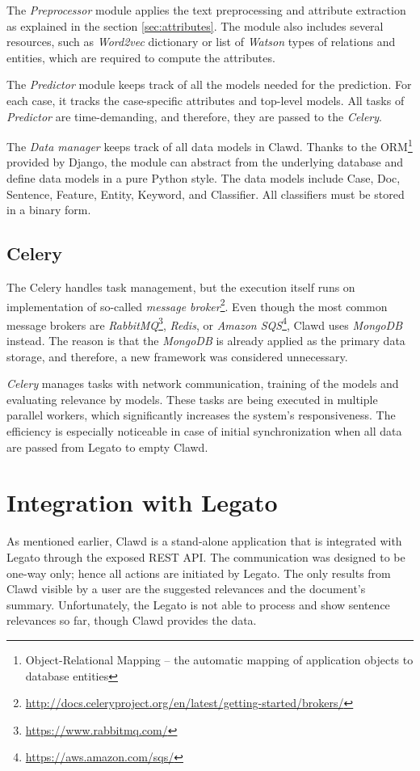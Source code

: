 \documentclass[
  digital, %
  notable,   %
  nolof,     %
  nolot,     %
]{fithesis3}
\begin{document}
The \textit{Preprocessor} module applies the text preprocessing and attribute extraction as explained in the section \ref{sec:attributes}.
The module also includes several resources, such as \textit{Word2vec} dictionary or list of \textit{Watson} types of relations and entities, which are required to compute the attributes.

The \textit{Predictor} module keeps track of all the models needed for the prediction.
For each case, it tracks the case-specific attributes and top-level models.
All tasks of \textit{Predictor} are time-demanding, and therefore, they are passed to the \textit{Celery}.

The \textit{Data manager} keeps track of all data models in Clawd.
Thanks to the ORM\footnote{Object-Relational Mapping -- the automatic mapping of application objects to database entities} provided by Django, the module can abstract from the underlying database and define data models in a pure Python style.
The data models include Case, Doc, Sentence, Feature, Entity, Keyword, and Classifier.
All classifiers must be stored in a binary form.

\subsection{Celery}
The Celery handles task management, but the execution itself runs on implementation of so-called \textit{message broker}\footnote{\url{http://docs.celeryproject.org/en/latest/getting-started/brokers/}}.
Even though the most common message brokers are \textit{RabbitMQ}\footnote{\url{https://www.rabbitmq.com/}}, \textit{Redis}, or \textit{Amazon SQS}\footnote{\url{https://aws.amazon.com/sqs/}}, Clawd uses \textit{MongoDB} instead.
The reason is that the \textit{MongoDB} is already applied as the primary data storage, and therefore, a new framework was considered unnecessary.

\textit{Celery} manages tasks with network communication, training of the models and evaluating relevance by models.
These tasks are being executed in multiple parallel workers, which significantly increases the system's responsiveness.
The efficiency is especially noticeable in case of initial synchronization when all data are passed from Legato to empty Clawd.


\section{Integration with Legato}
As mentioned earlier, Clawd is a stand-alone application that is integrated with Legato through the exposed REST API.
The communication was designed to be one-way only; hence all actions are initiated by Legato.
The only results from Clawd visible by a user are the suggested relevances and the document's summary.
Unfortunately, the Legato is not able to process and show sentence relevances so far, though Clawd provides the data.
\end{document}
